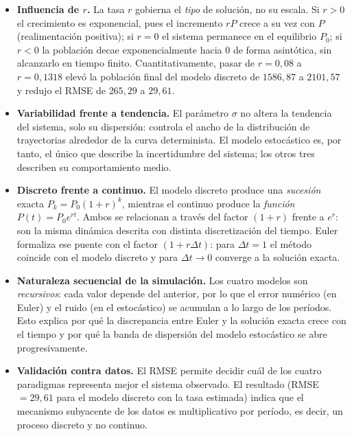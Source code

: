 \documentclass[11pt,a4paper]{article}
\begin{document}
\begin{itemize}[leftmargin=*]
  \item \textbf{Influencia de $r$.} La tasa $r$ gobierna el \emph{tipo} de soluci\'on, no su
        escala. Si $r>0$ el crecimiento es exponencial, pues el incremento $rP$ crece a su
        vez con $P$ (realimentaci\'on positiva); si $r=0$ el sistema permanece en el
        equilibrio $P_0$; si $r<0$ la poblaci\'on decae exponencialmente hacia $0$ de forma
        asint\'otica, sin alcanzarlo en tiempo finito. Cuantitativamente, pasar de
        $r = 0{,}08$ a $r = 0{,}1318$ elev\'o la poblaci\'on final del modelo discreto de
        $1586{,}87$ a $2101{,}57$ y redujo el RMSE de $265{,}29$ a $29{,}61$.
  \item \textbf{Variabilidad frente a tendencia.} El par\'ametro $\sigma$ no altera la
        tendencia del sistema, solo su dispersi\'on: controla el ancho de la distribuci\'on
        de trayectorias alrededor de la curva determinista. El modelo estoc\'astico es, por
        tanto, el \'unico que describe la incertidumbre del sistema; los otros tres
        describen su comportamiento medio.
  \item \textbf{Discreto frente a continuo.} El modelo discreto produce una
        \emph{sucesi\'on} exacta $P_k = P_0(1+r)^k$, mientras el continuo produce la
        \emph{funci\'on} $P(t) = P_0e^{rt}$. Ambos se relacionan a trav\'es del factor
        $(1+r)$ frente a $e^{r}$: son la misma din\'amica descrita con distinta
        discretizaci\'on del tiempo. Euler formaliza ese puente con el factor
        $(1+r\Delta t)$: para $\Delta t = 1$ el m\'etodo coincide con el modelo discreto y
        para $\Delta t \to 0$ converge a la soluci\'on exacta.
  \item \textbf{Naturaleza secuencial de la simulaci\'on.} Los cuatro modelos son
        \emph{recursivos}: cada valor depende del anterior, por lo que el error num\'erico
        (en Euler) y el ruido (en el estoc\'astico) se acumulan a lo largo de los
        per\'iodos. Esto explica por qu\'e la discrepancia entre Euler y la soluci\'on
        exacta crece con el tiempo y por qu\'e la banda de dispersi\'on del modelo
        estoc\'astico se abre progresivamente.
  \item \textbf{Validaci\'on contra datos.} El RMSE permite decidir cu\'al de los cuatro
        paradigmas representa mejor el sistema observado. El resultado
        (RMSE $= 29{,}61$ para el modelo discreto con la tasa estimada) indica que el
        mecanismo subyacente de los datos es multiplicativo por per\'iodo, es decir,
        un proceso discreto y no continuo.
\end{itemize}
\end{document}
